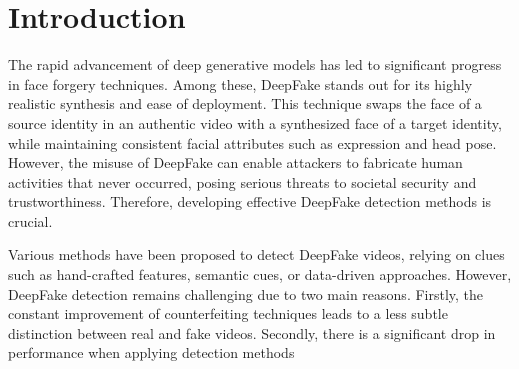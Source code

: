 \section{Introduction}
\vspace{1.5cm}
The rapid advancement of deep generative models has led to
significant progress in face forgery techniques. Among these,
DeepFake stands out for its highly realistic synthesis and ease of
deployment. This technique swaps the face of a source identity in an
authentic video with a synthesized face of a target identity, while
maintaining consistent facial attributes such as expression and head
pose. However, the misuse of DeepFake can enable attackers to
fabricate human activities that never occurred, posing serious
threats to societal security and trustworthiness. Therefore,
developing effective DeepFake detection methods is crucial.
\vspace{1.0cm}

Various methods have been proposed to detect DeepFake videos,
relying on clues such as hand-crafted features, semantic cues, or
data-driven approaches. However, DeepFake detection remains
challenging due to two main reasons. Firstly, the constant
improvement of counterfeiting techniques leads to a less subtle
distinction between real and fake videos. Secondly, there is a
significant drop in performance when applying detection methods